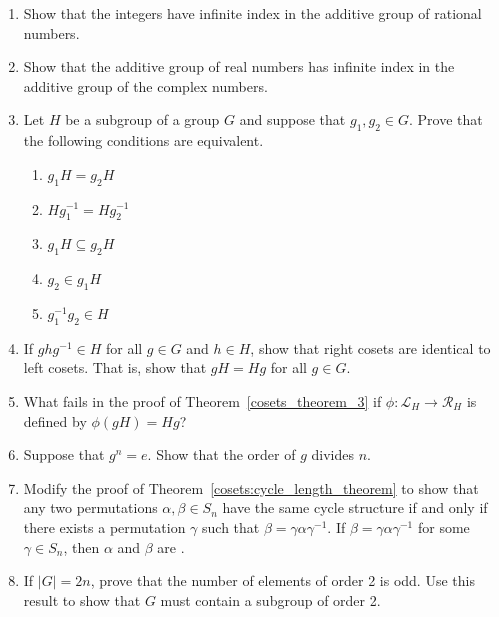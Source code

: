 {\begin{enumerate}
\item
Show that the integers have infinite index in the additive group of rational numbers.
 
\item
Show that the additive group of real numbers has infinite index in the additive group of the complex numbers.
 
\item
Let $H$ be a subgroup of a group $G$ and suppose that $g_1, g_2 \in G$.  Prove that the following conditions are equivalent.
\begin{enumerate}
 
\item
$g_1 H = g_2 H$
 
\item
$H g_1^{-1}  = H g_2^{-1}$
 
\item
$g_1 H \subseteq g_2 H$
 
\item
$g_2 \in g_1 H$
 
\item
$g_1^{-1} g_2 \in H$
 
\end{enumerate}
 
\item
If $ghg^{-1} \in H$ for all $g \in G$ and $h \in H$, show that right cosets are identical to left cosets.  That is, show that $gH = Hg$ for all $g \in G$.

 
\item
What fails in the proof of Theorem~\ref{cosets_theorem_3} if $\phi :  {\mathcal L}_H \rightarrow {\mathcal R}_H$ is defined by $\phi( gH ) = Hg$?
 
\item
Suppose that $g^n = e$. Show that the order of $g$ divides
$n$.
 
\item
Modify the proof of Theorem~\ref{cosets:cycle_length_theorem} to show that any two permutations $\alpha, \beta \in S_n$ have the same cycle structure if and only if there exists a  permutation $\gamma$ such that $\beta = \gamma \alpha \gamma^{-1}$.  If $\beta = \gamma \alpha \gamma^{-1}$ for some $\gamma \in S_n$, then $\alpha$ and $\beta$ are .

\item
If $|G| = 2n$, prove that the number of elements of order 2 is odd.  Use this result to show that $G$ must contain a subgroup of order 2.


\end{enumerate}}
